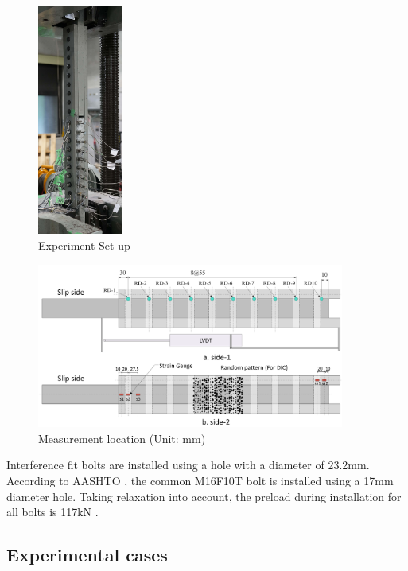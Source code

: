 \begin{figure}
    \centering
    \includegraphics[width=0.25\textwidth]{imgs/ch6/set-up.jpg}
    \caption{Experiment Set-up}
    \label{fig-setup}
\end{figure}

\begin{figure}
    \centering
    \includegraphics[width=0.9\textwidth]{imgs/ch6/mealoc.pdf}
    \caption{Measurement location (Unit: mm)}
    \label{fig-mealoc}
\end{figure}

Interference fit bolts are installed using a hole with a diameter of 23.2mm. According to AASHTO \cite{AASHTO2020}, the common M16F10T bolt is installed using a 17mm diameter hole. Taking relaxation into account, the preload during installation for all bolts is 117kN \cite{douji2017}.

\subsection{Experimental cases}

